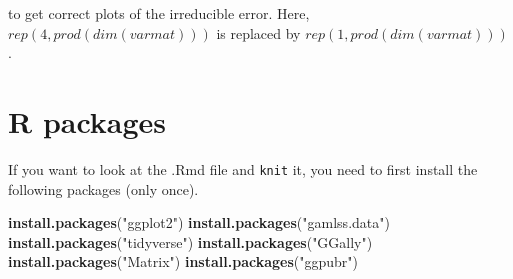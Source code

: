 \documentclass[]{article}
\newenvironment{Shaded}{\begin{snugshade}}{\end{snugshade}}
\newcommand{\KeywordTok}[1]{\textcolor[rgb]{0.13,0.29,0.53}{\textbf{#1}}}
\newcommand{\StringTok}[1]{\textcolor[rgb]{0.31,0.60,0.02}{#1}}
\newcommand{\NormalTok}[1]{#1}
\begin{document}
to get correct plots of the irreducible error. Here,
\(rep(4,prod(dim(varmat)))\) is replaced by
\(rep(1,prod(dim(varmat)))\).

\section{ R packages}\label{r-packages}

If you want to look at the .Rmd file and \texttt{knit} it, you need to
first install the following packages (only once).

\begin{Shaded}
\begin{Highlighting}[]
\KeywordTok{install.packages}\NormalTok{(}\StringTok{"ggplot2"}\NormalTok{)}
\KeywordTok{install.packages}\NormalTok{(}\StringTok{"gamlss.data"}\NormalTok{)}
\KeywordTok{install.packages}\NormalTok{(}\StringTok{"tidyverse"}\NormalTok{)}
\KeywordTok{install.packages}\NormalTok{(}\StringTok{"GGally"}\NormalTok{)}
\KeywordTok{install.packages}\NormalTok{(}\StringTok{"Matrix"}\NormalTok{)}
\KeywordTok{install.packages}\NormalTok{(}\StringTok{"ggpubr"}\NormalTok{)}
\end{Highlighting}
\end{Shaded}
\end{document}
